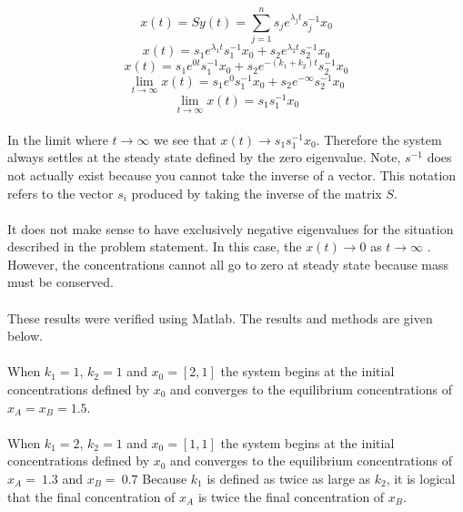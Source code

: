 \documentclass[10pt]{article}
\begin{document}
\[ x(t)=S y(t) = \sum_{j=1}^{n} s_j e^{\lambda_j t}s_j^{-1}x_0 \]
\[x(t)=s_1 e^{\lambda_1 t}s_1^{-1}x_0 + s_2 e^{\lambda_2 t}s_2^{-1}x_0 \]
\[x(t)=s_1 e^{0 t}s_1^{-1}x_0 + s_2 e^{-(k_1+k_2) t}s_2^{-1}x_0 \]
\[\lim_{t\to\infty} x(t)=s_1 e^{0}s_1^{-1}x_0 + s_2 e^{-\infty}s_2^{-1}x_0 \]
\[\lim_{t\to\infty} x(t)=s_1 s_1^{-1} x_0 \]
\\
In the limit where $t \rightarrow \infty $ we see that $x(t) \rightarrow s_1 s_1^{-1} x_0$. Therefore the system always settles at the steady state defined by the zero eigenvalue. Note, $s^{-1}$ does not actually exist because you cannot take the inverse of a vector. This notation refers to the vector $s_i$ produced by taking the inverse of the matrix $S$. 
\\ \\
It does not make sense to have exclusively negative eigenvalues for the situation described in the problem statement. In this case, the $x(t) \rightarrow 0$ as $t \rightarrow \infty$ . However, the concentrations cannot all go to zero at steady state because mass must be conserved. \\ 
\\
These results were verified using Matlab. The results and methods are given below.  \\ \\
When $k_1=1$, $k_2=1$ and $x_0=[2,1]$ the system begins at the initial concentrations defined by $x_0$ and converges to the equilibrium concentrations of $x_A=x_B=1.5$. \\ \\
When $k_1=2$, $k_2=1$ and $x_0=[1,1]$ the system begins at the initial concentrations defined by $x_0$ and converges to the equilibrium concentrations of $x_A=~1.3$ and $x_B=~0.7$ Because $k_1$ is defined as twice as large as $k_2$, it is logical that the final concentration of $x_A$ is twice the final concentration of $x_B$. \\ \\

 
\end{document}
